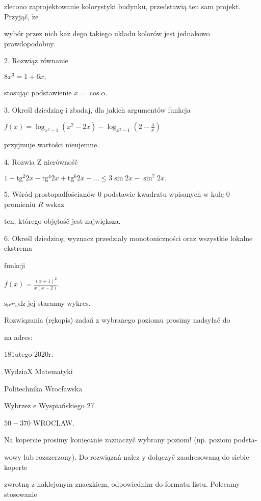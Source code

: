 \documentclass[a4paper,12pt]{article}
\begin{document}
zlecono zaprojektowanie kolorystyki budynku, przedstawią ten sam projekt. Przyjąč, $\dot{\mathrm{z}}\mathrm{e}$

wybór przez nich $\mathrm{k}\mathrm{a}\dot{\mathrm{z}}$ dego takiego ukladu kolorów jest jednakowo prawdopodobny.

2. Rozwiąz równanie

$8x^{3}=1+6x,$

stosując podstawienie $x=\cos\alpha.$

3. Określ dziedzinę $\mathrm{i}$ zbadaj, dla jakich argumentów funkcja

$f(x)=\displaystyle \log_{x^{2}-1}(x^{2}-2x)-\log_{x^{2}-1}(2-\frac{4}{x})$

przyjmuje wartości nieujemne.

4. Rozwia $\dot{\mathrm{Z}}$ nierównośč

$1+\mathrm{t}\mathrm{g}^{2}2x-\mathrm{t}\mathrm{g}^{4}2x+\mathrm{t}\mathrm{g}^{6}2x-\ldots\leq 3\sin 2x-\sin^{2}2x.$

5. Wśród prostopadfościanów $0$ podstawie kwadratu wpisanych $\mathrm{w}$ kulę $0$ promieniu $R$ wskaz

ten, którego objętośč jest największa.

6. Określ dziedzinę, wyznacz przedzialy monotoniczności oraz wszystkie lokalne ekstrema

funkcji

$f(x)=\displaystyle \frac{(x+1)^{2}}{x(x-2)}.$

$\mathrm{s}_{\mathrm{P}^{\mathrm{o}\mathrm{r}\mathrm{z}}\mathrm{a}}\mathrm{d}\acute{\mathrm{z}}$ jej staranny wykres.

Rozwiqzania (rękopis) zadań z wybranego poziomu prosimy nadsyłač do

na adres:

181utego 2020r.

WydziaX Matematyki

Politechnika Wrocfawska

Wybrzez $\mathrm{e}$ Wyspiańskiego 27

$50-370$ WROCLAW.

Na kopercie prosimy $\underline{\mathrm{k}\mathrm{o}\mathrm{n}\mathrm{i}\mathrm{e}\mathrm{c}z\mathrm{n}\mathrm{i}\mathrm{e}}$ zaznaczyč wybrany poziom! (np. poziom podsta-

wowy lub rozszerzony). Do rozwiązań nalez $\mathrm{y}$ dołączyč zaadresowaną do siebie koperte

zwrotną $\mathrm{z}$ naklejonym znaczkiem, odpowiednim do formatu listu. Polecamy stosowanie
\end{document}
